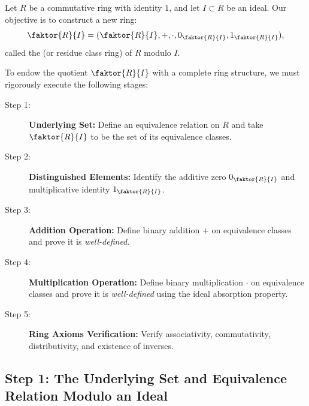 \begin{content}
Let $R$ be a commutative ring with identity $1$, and let $I \subset R$ be an ideal. Our objective is to construct a new ring:
\begin{equation}\label{eq:quotient-ring-symbol}
\faktor{R}{I} = (\faktor{R}{I}, +, \cdot, 0_{\faktor{R}{I}}, 1_{\faktor{R}{I}}),
\end{equation}
called the  (or residue class ring) of $R$ modulo $I$.

\begin{steps}
To endow the quotient $\faktor{R}{I}$ with a complete ring structure, we must rigorously execute the following stages:
\begin{description}
    \item[Step 1:] \textbf{Underlying Set:} Define an equivalence relation on $R$ and take $\faktor{R}{I}$ to be the set of its equivalence classes.
    \item[Step 2:] \textbf{Distinguished Elements:} Identify the additive zero $0_{\faktor{R}{I}}$ and multiplicative identity $1_{\faktor{R}{I}}$.
    \item[Step 3:] \textbf{Addition Operation:} Define binary addition $+$ on equivalence classes and prove it is \emph{well-defined}.
    \item[Step 4:] \textbf{Multiplication Operation:} Define binary multiplication $\cdot$ on equivalence classes and prove it is \emph{well-defined} using the ideal absorption property.
    \item[Step 5:] \textbf{Ring Axioms Verification:} Verify associativity, commutativity, distributivity, and existence of inverses.
\end{description}
\end{steps}
\end{content}

\subsection{Step 1: The Underlying Set and Equivalence Relation Modulo an Ideal}


